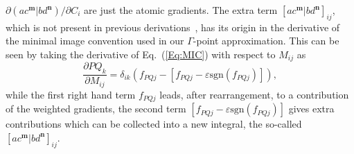 \documentclass[prl,twocolumn,showpacs,twocolumngrid,superbib]{revtex4}
\begin{document}
$\partial (ac^\mathbf{m}|bd^\mathbf{n})/\partial C_{i}$ are just the atomic gradients.
The extra term $[ac^\mathbf{m}|bd^\mathbf{n}]_{ij}$, which is not present in 
previous derivations~\cite{MTobita03,KKudin00B,KDoll04}, 
has its origin in the derivative of the minimal image convention used in 
our $\Gamma$-point approximation. 
This can be seen by taking the derivative of Eq.~(\ref{Eq:MIC}) with respect to $M_{ij}$ as
\begin{equation*}
  \frac{\partial PQ_k}{\partial M_{ij}}=\delta_{ik}(f_{PQj}-[f_{PQj}-\varepsilon\mathrm{sgn}(f_{PQj})]),
\end{equation*}
while the first right hand term $f_{PQj}$ leads, after rearrangement, 
to a contribution of the weighted gradients, 
the second term $[f_{PQj}-\varepsilon \mathrm{sgn}(f_{PQj})]$
gives extra contributions which can be collected into a new integral, the so-called
$[ac^\mathbf{m}|bd^\mathbf{n}]_{ij}$.

\end{document}
